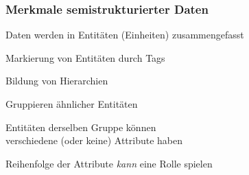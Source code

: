     \begin{frame}
      \frametitle{Merkmale semistrukturierter Daten}
      
      Daten werden in Entitäten (Einheiten) zusammengefasst
      \begin{Itemize}
        \item
          Markierung von Entitäten durch Tags
        \item
          Bildung von Hierarchien
        \item
          Gruppieren ähnlicher Entitäten
        \item
          Entitäten derselben Gruppe können \\
          verschiedene (oder keine) Attribute haben
        \item
          Reihenfolge der Attribute \emph{kann} eine Rolle spielen
          \par
      \end{Itemize}
      
      \par\bigskip

    \end{frame}

